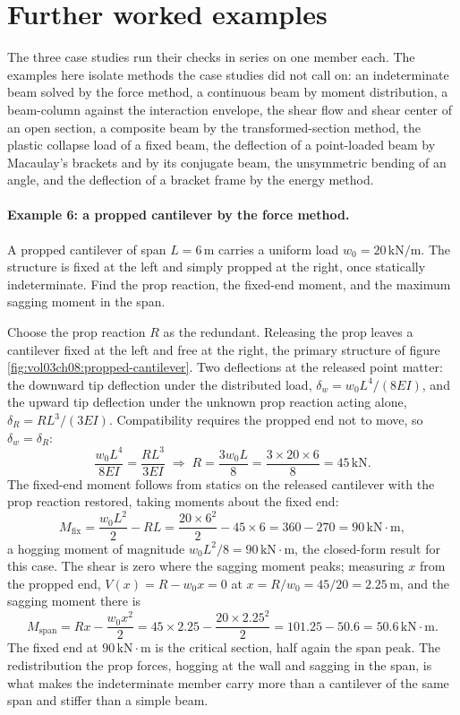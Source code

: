 \section{Further worked examples}

The three case studies run their checks in series on one member each. The
examples here isolate methods the case studies did not call on: an
indeterminate beam solved by the force method, a continuous beam by
moment distribution, a beam-column against the interaction envelope, the
shear flow and shear center of an open section, a composite beam by the
transformed-section method, the plastic collapse load of a fixed beam,
the deflection of a point-loaded beam by Macaulay's brackets and by its
conjugate beam, the unsymmetric bending of an angle, and the deflection
of a bracket frame by the energy method.

\paragraph{Example 6: a propped cantilever by the force method.}
A propped cantilever of span $L = 6\,\si{\meter}$ carries a uniform load
$w_0 = 20\,\text{kN}/\text{m}$. The structure is fixed at the left and
simply propped at the right, once statically indeterminate. Find the
prop reaction, the fixed-end moment, and the maximum sagging moment in
the span.

Choose the prop reaction $R$ as the redundant. Releasing the prop
leaves a cantilever fixed at the left and free at the right, the primary
structure of figure \ref{fig:vol03ch08:propped-cantilever}. Two
deflections at the released point matter: the downward tip deflection
under the distributed load, $\delta_w = w_0 L^4/(8EI)$, and the upward
tip deflection under the unknown prop reaction acting alone, $\delta_R =
R L^3/(3EI)$. Compatibility requires the propped end not to move, so
$\delta_w = \delta_R$:
\[
\frac{w_0 L^4}{8 EI} = \frac{R L^3}{3 EI}
\;\Rightarrow\;
R = \frac{3 w_0 L}{8} = \frac{3 \times 20 \times 6}{8} = 45\,\text{kN}.
\]
The fixed-end moment follows from statics on the released cantilever
with the prop reaction restored, taking moments about the fixed end:
\[
M_{\text{fix}} = \frac{w_0 L^2}{2} - R L
= \frac{20 \times 6^2}{2} - 45 \times 6 = 360 - 270 = 90\,\text{kN}
\cdot\text{m},
\]
a hogging moment of magnitude $w_0 L^2/8 = 90\,\text{kN}\cdot\text{m}$,
the closed-form result for this case. The shear is zero where the
sagging moment peaks; measuring $x$ from the propped end, $V(x) = R -
w_0 x = 0$ at $x = R/w_0 = 45/20 = 2.25\,\si{\meter}$, and the sagging
moment there is
\[
M_{\text{span}} = R x - \frac{w_0 x^2}{2}
= 45 \times 2.25 - \frac{20 \times 2.25^2}{2}
= 101.25 - 50.6 = 50.6\,\text{kN}\cdot\text{m}.
\]
The fixed end at $90\,\text{kN}\cdot\text{m}$ is the critical section,
half again the span peak. The redistribution the prop forces, hogging
at the wall and sagging in the span, is what makes the indeterminate
member carry more than a cantilever of the same span and stiffer than a
simple beam.

